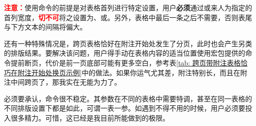\documentclass[print, doctor, vlined]{DissertUESTC}
\begin{document}
	\textcolor{red}{\textbf{注意：}}使用命令的前提是对表格首列进行特定设置，用户\textbf{必须}通过或来人为指定的首列宽度，\textcolor{red}{\textbf{切不可}}将之设置为、或。另外，表格中最后一条之后不需要\shadcmd{\shadcmd{}}，否则表尾与下方文本的间隔将偏大。

	还有一种特殊情况是，跨页表格恰好在附注开始处发生了分页，此时也会产生另类的排版结果。要解决该问题，用户得手动在表格内容的适当位置使用\href{https://mirrors.tuna.tsinghua.edu.cn/CTAN/macros/latex/required/tools/longtable.pdf}{}宏包提供的命令提前断页，代价是前一页底部可能有更多空白，参考表\ref{tab: 跨页带附注表格恰巧在附注开始处换页示例}中的做法。如果你运气尤其差，附注特别长，而且在附注中间跨页了，那我实在无能为力了。

	必须要承认，命令很不稳定。其参数在不同的表格中需要特调，甚至在同一表格的不同排版设置下都是如此，可谓一表一参。如遇到不得不用的时候，用户必须要投入很多精力。可惜，这已经是我目前所能做到的极限。


	\newpage
\end{document}
